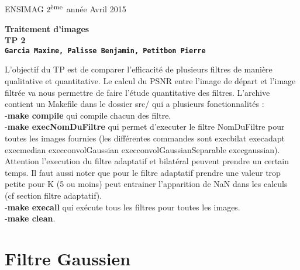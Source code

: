 \documentclass[12pt]{article}
\newcommand{\noi}{\noindent}
\numberwithin{equation}{section}
\begin{document}
\baselineskip7mm

\noi ENSIMAG $2^{\footnotesize \mbox{ème}}$ année   \hfill Avril 2015


\vspace{1cm}


\begin{center}
{\Large \bf Traitement d'images\\ TP 2\\ \texttt{Garcia Maxime, Palisse Benjamin, Petitbon Pierre}}
\end{center}

\vspace{5mm}

L'objectif du TP est de comparer l'efficacité de plusieurs filtres de manière qualitative et quantitative. Le calcul du PSNR entre l'image de départ et l'image filtrée va nous permettre de faire l'étude quantitative des filtres. L'archive contient un Makefile dans le dossier src/ qui a plusieurs fonctionnalités : \\
-\textbf{make compile }qui compile chacun des filtre.\\
-\textbf{make execNomDuFiltre }qui permet d'executer le filtre NomDuFiltre pour toutes les images fournies
(les différentes commandes sont execbilat execadapt execmedian execconvolGaussian execconvolGaussianSeparable execgaussian). Attention l'execution du filtre adaptatif et bilatéral peuvent prendre un certain temps. Il faut aussi noter que pour le filtre adaptatif prendre une valeur trop petite pour K (5 ou moins) peut entrainer l'apparition de NaN dans les calculs (cf section filtre adaptatif).\\
-\textbf{make execall} qui exécute tous les filtres pour toutes les images.\\
-\textbf{make clean}.\\
\section{Filtre Gaussien}
\end{document}
